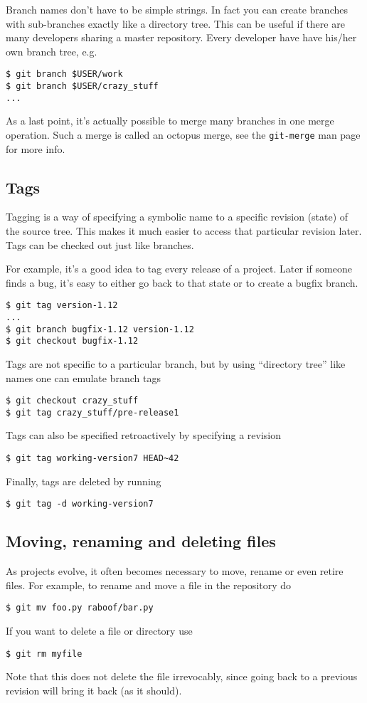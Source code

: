 \documentclass[a4paper,10pt]{article}
\begin{document}
Branch names don't have to be simple strings. In fact you can create branches
with sub-branches exactly like a directory tree. This can be useful if there
are many developers sharing a master repository. Every developer have have
his/her own branch tree, e.g.
\begin{verbatim}
$ git branch $USER/work
$ git branch $USER/crazy_stuff
...
\end{verbatim}

As a last point, it's actually possible to merge many branches in one merge
operation.  Such a merge is called an octopus merge, see the
\texttt{git-merge} man page for more info.

\subsection{Tags}
Tagging is a way of specifying a symbolic name to a specific revision (state) 
of the source tree. This makes it much easier to access that particular
revision later. Tags can be checked out just like branches.

For example, it's a good idea to tag every release of a
project. Later if someone finds a bug, it's easy to either go back to that
state or to create a bugfix branch.
\begin{verbatim}
$ git tag version-1.12
...
$ git branch bugfix-1.12 version-1.12
$ git checkout bugfix-1.12
\end{verbatim}
Tags are not specific to a particular branch, but by using
``directory tree'' like names one can emulate branch tags
\begin{verbatim}
$ git checkout crazy_stuff
$ git tag crazy_stuff/pre-release1
\end{verbatim}
Tags can also be specified retroactively by specifying a revision
\begin{verbatim}
$ git tag working-version7 HEAD~42
\end{verbatim}
Finally, tags are deleted by running
\begin{verbatim}
$ git tag -d working-version7 
\end{verbatim}

\subsection{Moving, renaming and deleting files}
As projects evolve, it often becomes necessary to move, rename or even retire 
files. For example, to rename and move a file in the repository do 
\begin{verbatim}
$ git mv foo.py raboof/bar.py
\end{verbatim}
If you want to delete a file or directory use
\begin{verbatim}
$ git rm myfile
\end{verbatim}
Note that this does not delete the file irrevocably, since going back to a
previous revision will bring it back (as it should).
\end{document}
